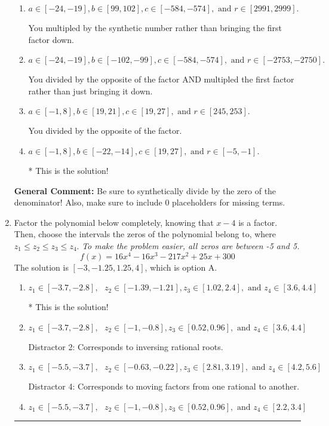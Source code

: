 \documentclass{extbook}[14pt]
\newcommand{\litem}[1]{\item #1

\rule{\textwidth}{0.4pt}}
\begin{document}
\begin{enumerate}
{\begin{enumerate}[label=\Alph*.]
 You multipled by the synthetic number and subtracted rather than adding during synthetic division.
\item \( a \in [-24, -19], b \in [99, 102], c \in [-584, -574], \text{ and } r \in [2991, 2999]. \)

 You multipled by the synthetic number rather than bringing the first factor down.
\item \( a \in [-24, -19], b \in [-102, -99], c \in [-584, -574], \text{ and } r \in [-2753, -2750]. \)

 You divided by the opposite of the factor AND multipled the first factor rather than just bringing it down.
\item \( a \in [-1, 8], b \in [19, 21], c \in [19, 27], \text{ and } r \in [245, 253]. \)

 You divided by the opposite of the factor.
\item \( a \in [-1, 8], b \in [-22, -14], c \in [19, 27], \text{ and } r \in [-5, -1]. \)

* This is the solution!
\end{enumerate}

\textbf{General Comment:} Be sure to synthetically divide by the zero of the denominator! Also, make sure to include 0 placeholders for missing terms.
}
\litem{
Factor the polynomial below completely, knowing that $x -4$ is a factor. Then, choose the intervals the zeros of the polynomial belong to, where $z_1 \leq z_2 \leq z_3 \leq z_4$. \textit{To make the problem easier, all zeros are between -5 and 5.}
\[ f(x) = 16x^{4} -16 x^{3} -217 x^{2} +25 x + 300 \]The solution is \( [-3, -1.25, 1.25, 4] \), which is option A.\begin{enumerate}[label=\Alph*.]
\item \( z_1 \in [-3.7, -2.8], \text{   }  z_2 \in [-1.39, -1.21], z_3 \in [1.02, 2.4], \text{   and   } z_4 \in [3.6, 4.4] \)

* This is the solution!
\item \( z_1 \in [-3.7, -2.8], \text{   }  z_2 \in [-1, -0.8], z_3 \in [0.52, 0.96], \text{   and   } z_4 \in [3.6, 4.4] \)

 Distractor 2: Corresponds to inversing rational roots.
\item \( z_1 \in [-5.5, -3.7], \text{   }  z_2 \in [-0.63, -0.22], z_3 \in [2.81, 3.19], \text{   and   } z_4 \in [4.2, 5.6] \)

 Distractor 4: Corresponds to moving factors from one rational to another.
\item \( z_1 \in [-5.5, -3.7], \text{   }  z_2 \in [-1, -0.8], z_3 \in [0.52, 0.96], \text{   and   } z_4 \in [2.2, 3.4] \)


\end{enumerate}}
\end{enumerate}
\end{document}

